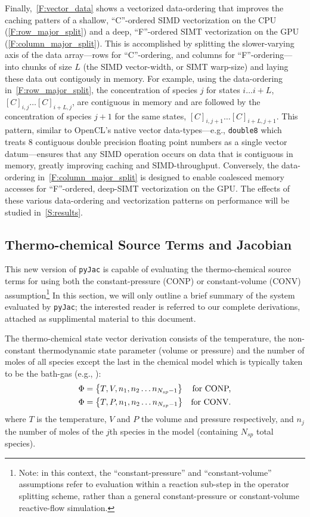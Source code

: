 \documentclass[12pt,number,sort&compress]{elsarticle}
\newcommand{\ns}{N_{sp}}
\newcommand{\conp}{CONP}
\newcommand{\conv}{CONV}
\newcommand{\dconp}{\ifmmode\text{for \conp,}\else for \conp,\fi}
\newcommand{\dconv}{\ifmmode\text{for \conv,}\else for \conv.\fi}
\begin{document}
Finally,~\cref{F:vector_data} shows a vectorized data-ordering that improves the caching patters of a shallow, ``C''-ordered SIMD vectorization on the CPU (\cref{F:row_major_split}) and a deep, ``F''-ordered SIMT vectorization on the GPU (\cref{F:column_major_split}).
This is accomplished by splitting the slower-varying axis of the data array---rows for ``C''-ordering, and columns for ``F''-ordering---into chunks of size $L$ (the SIMD vector-width, or SIMT warp-size) and laying these data out contigously in memory.
For example, using the data-ordering in~\cref{F:row_major_split}, the concentration of species $j$ for states $i\ldots i+L$, $[C]_{i, j} \ldots [C]_{i + L, j}$, are contiguous in memory and are followed by the concentration of species $j + 1$ for the same states, $[C]_{i, j + 1} \ldots [C]_{i + L, j + 1}$.
This pattern, similar to OpenCL's native vector data-types---e.g., \texttt{double\num{8}} which treats \num{8} contiguous double precision floating point numbers as a single vector datum---ensures that any SIMD operation occurs on data that is contiguous in memory, greatly improving caching and SIMD-throughput.
Conversely, the data-ordering in~\cref{F:column_major_split} is designed to enable coalesced memory accesses for ``F''-ordered, deep-SIMT vectorization on the GPU.
The effects of these various data-ordering and vectorization patterns on performance will be studied in~\cref{S:results}.

\subsection{Thermo-chemical Source Terms and Jacobian}
This new version of \texttt{pyJac} is capable of evaluating the thermo-chemical source terms for using both the constant-pressure (\conp) or constant-volume (\conv) assumption\footnote{Note: in this context, the ``constant-pressure'' and ``constant-volume'' assumptions refer to evaluation within a reaction sub-step in the operator splitting scheme, rather than a general constant-pressure or constant-volume reactive-flow simulation.}
In this section, we will only outline a brief summary of the system evaluated by \texttt{pyJac}; the interested reader is referred to our complete derivations, attached as supplimental material to this document.

The thermo-chemical state vector derivation consists of the temperature, the non-constant thermodynamic state parameter (volume or pressure) and the number of moles of all species except the last in the chemical model which is typically taken to be the bath-gas (e.g., ):
\begin{subequations}
\begin{align}
\Phi &= \left\{T, V, n_1, n_2 \ldots n_{\ns - 1}\right\}&\text{\dconp}\\
\Phi &= \left\{T, P, n_1, n_2 \ldots n_{\ns - 1}\right\}&\text{\dconv}
\end{align}
\end{subequations}
where $T$ is the temperature, $V$ and $P$ the volume and pressure respectively, and $n_j$ the number of moles of the $j$th species in the model (containing $\ns$ total species).
\end{document}

